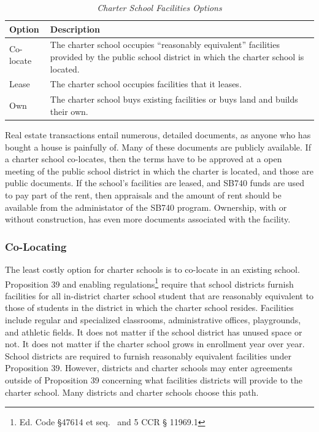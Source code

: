 \begin{table}[ht]
  \small%
  \caption[Charter School Facilities Options]{\textit{Charter School Facilities Options}}\label{tab:charter-facilities-options}%
  \begin{tabular}{ll}
    \toprule%
    Option    & Description \\
    \midrule%
    Co-locate & \multirow[t]{2}{4.75in}{The charter school occupies ``reasonably equivalent'' facilities provided by 
                the public school district in which the charter school is located.}\\
                \\
    Lease     & The charter school occupies facilities that it leases.\\
    Own       & The charter school buys existing facilities or buys land and builds their own. \\
    \bottomrule%
  \end{tabular}
\end{table}

Real estate transactions entail numerous, detailed documents, as anyone who has bought a house is painfully of. Many of these documents are publicly available. If a charter school co-locates, then the terms have to be approved at a open meeting of the public school district in which the charter is located, and those are public documents. If the school's facilities are leased, and SB740 funds are used to pay part of the rent, then appraisals and the amount of rent should be available from the administator of the SB740 program. Ownership, with or without construction, has even more documents associated with the facility.

\subsubsection{Co-Locating}\label{sec:co-locating}\indent

The least costly option for charter schools is to co-locate in an existing school. Proposition 39 and enabling regulations\footnote{Ed. Code §47614 et seq.  and 5 CCR § 11969.1} require that school districts furnish facilities for all in-district charter school student that are reasonably equivalent to those of students in the district in which the charter school resides. Facilities include regular and specialized classrooms, administrative offices, playgrounds, and athletic fields. It does not matter if the school district has unused space or not. It does not matter if the charter school grows in enrollment year over year. School districts are required to furnish reasonably equivalent facilities under Proposition 39. However, districts and charter schools may enter agreements outside of Proposition 39 concerning what facilities districts will provide to the charter school. Many districts and charter schools choose this path.

